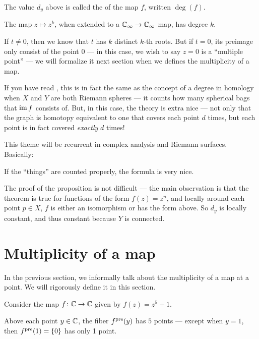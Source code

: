 \begin{definition}
	The value $d_y$ above is called the  of the map $f$, written $\deg(f)$.
\end{definition}

\begin{example}
	The map $z \mapsto z^k$, when extended to a $\mathbb C_\infty \to \mathbb C_\infty$ map, has degree $k$.
\end{example}
If $t \neq 0$, then we know that $t$ has $k$ distinct $k$-th roots.
But if $t = 0$, its preimage only consist of the point $0$ --- in this case, we wish to say $z = 0$
is a ``multiple point'' --- we will formalize it next section when we defines the multiplicity of a
map.

If you have read ,
this is in fact the same as the concept of a degree in homology when $X$ and $Y$ are both Riemann
spheres --- it counts how many spherical bags that $\operatorname{im} f$ consists of.
But, in this case, the theory is extra nice --- not only that the graph is homotopy equivalent to
one that covers each point $d$ times, but each point is in fact covered \emph{exactly} $d$ times!

This theme will be recurrent in complex analysis and Riemann surfaces. Basically:
\begin{moral}
	If the ``things'' are counted properly, the formula is very nice.
\end{moral}


The proof of the proposition is not difficult --- the main observation is that the theorem is true
for functions of the form $f(z) = z^n$, and locally around each point $p \in X$, $f$ is either an
isomorphism or has the form above.
So $d_y$ is locally constant, and thus constant because $Y$ is connected.


\section{Multiplicity of a map}

In the previous section, we informally talk about the multiplicity of a map at a point. We will
rigorously define it in this section.

\begin{example}
	Consider the map $f \colon \mathbb C \to \mathbb C$ given by $f(z) = z^5 + 1$.

	Above each point $y \in \mathbb C$, the fiber $f^{\text{pre}}(y)$ has $5$ points --- except when $y = 1$, then
	$f^{\text{pre}}(1) = \{ 0 \}$ has only 1 point.
\end{example}

